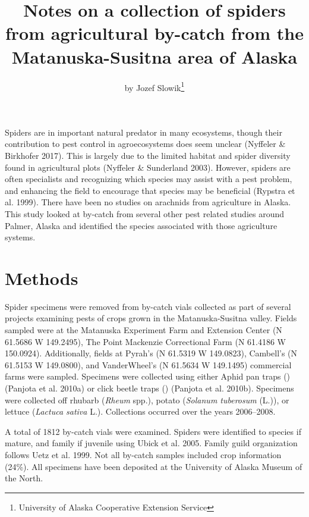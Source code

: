 \title{Notes on a collection of spiders from agricultural by-catch from the Matanuska-Susitna area of Alaska}

\author{by Jozef Slowik\footnote{University of Alaska Cooperative Extension Service}}

\maketitle

Spiders are in important natural predator in many ecosystems, though their contribution to pest control in agroecosystems does seem unclear (Nyffeler \& Birkhofer 2017). This is largely due to the limited habitat and spider diversity found in agricultural plots (Nyffeler \& Sunderland 2003). However, spiders are often specialists and recognizing which species may assist with a pest problem, and enhancing the field to encourage that species may be beneficial (Rypstra et al. 1999). There have been no studies on arachnids from agriculture in Alaska. This study looked at by-catch from several other pest related studies around Palmer, Alaska and identified the species associated with those agriculture systems.

\section{Methods}

Spider specimens were removed from by-catch vials collected as part of several  projects examining pests of crops grown in the Matanuska-Susitna valley. Fields sampled were at the Matanuska Experiment Farm and Extension Center (N 61.5686\textdegree{} W 149.2495\textdegree{}), The Point Mackenzie Correctional Farm (N 61.4186\textdegree{} W 150.0924\textdegree{}). Additionally, fields at Pyrah’s (N 61.5319\textdegree{} W 149.0823\textdegree{}), Cambell’s (N 61.5153\textdegree{} W 149.0800\textdegree{}), and VanderWheel’s (N 61.5634\textdegree{} W 149.1495\textdegree{}) commercial farms were sampled. Specimens were collected using either Aphid pan traps () (Panjota et al. 2010a) or click beetle traps () (Panjota et al. 2010b). Specimens were collected off rhubarb (\textit{Rheum} spp.), potato (\textit{Solanum tuberosum} (L.)), or lettuce (\textit{Lactuca sativa} L.). Collections occurred over the years 2006--2008. 

A total of 1812 by-catch vials were examined. Spiders were identified to species if mature, and family if juvenile using Ubick et al. 2005. 
Family guild organization follows Uetz et al. 1999. Not all by-catch samples included crop information (24\%). All specimens have been deposited at the University of Alaska Museum of the North.

